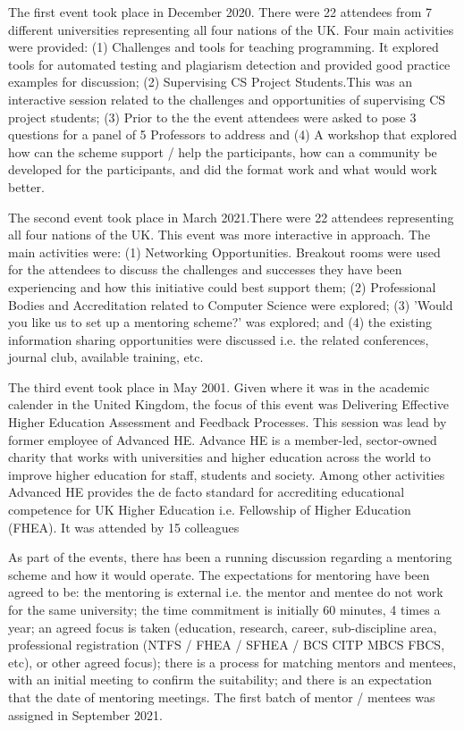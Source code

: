 \documentclass[sigconf]{acmart}
\begin{document}
The first event took place in December 2020. There were 22 attendees from 7 different universities representing all four nations of the UK. Four main activities were provided: (1) Challenges and tools for teaching programming. It explored tools for automated testing and plagiarism detection and provided good practice examples for discussion; (2) Supervising CS Project Students.This was an interactive session related to the challenges and opportunities of supervising CS project students; (3) Prior to the the event attendees were asked to pose 3 questions for a panel of 5 Professors to address and (4) A workshop that explored how can the scheme support / help the participants, how can a community be developed for the participants, and did the format work and what would work better.

The second event took place in March 2021.There were 22 attendees representing all four nations of the UK. This event was more interactive in approach. The main activities were: (1) Networking Opportunities. Breakout rooms were used for the attendees to discuss the challenges and successes they have been experiencing and how this initiative could best support them; (2) Professional Bodies and Accreditation related to Computer Science were explored; (3) 'Would you like us to set up a mentoring scheme?' was explored; and (4) the existing information sharing opportunities were discussed i.e. the related conferences, journal club, available training, etc. 

The third event took place in May 2001. Given where it was in the academic calender in the United Kingdom, the focus of this event was Delivering Effective Higher Education Assessment and Feedback Processes. This session was lead by former employee of Advanced HE. Advance HE is a member-led, sector-owned charity that works with universities and higher education across the world to improve higher education for staff, students and society. Among other activities Advanced HE provides the de facto standard for accrediting educational competence for UK Higher Education i.e. Fellowship of Higher Education (FHEA).  It was attended by 15 colleagues

As part of the events, there has been a running discussion regarding a mentoring scheme and how it would operate. The expectations for mentoring have been agreed to be: the mentoring is external i.e. the mentor and mentee do not work for the same university; the time commitment is initially 60 minutes, 4 times a year; an agreed focus is taken (education, research, career, sub-discipline area, professional registration (NTFS / FHEA / SFHEA / BCS CITP MBCS FBCS, etc), or other agreed focus); there is a process for matching mentors and mentees, with an initial meeting to confirm the suitability; and there is an expectation that the date of mentoring meetings. The first batch of mentor / mentees was assigned in September 2021. 
\end{document}
